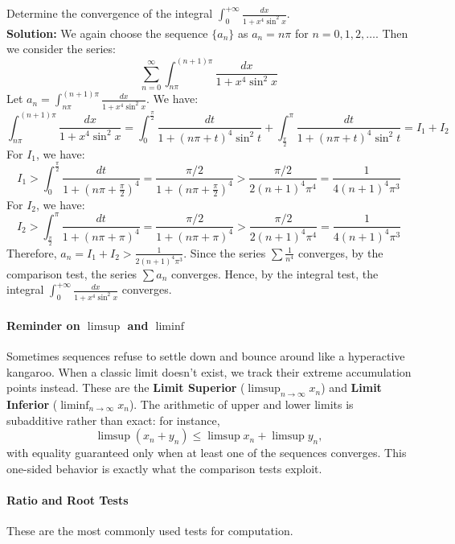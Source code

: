 \begin{example}
    Determine the convergence of the integral $\int_{0}^{+\infty} \frac{dx}{1 + x^4 \sin^2 x}$. \\
    \textbf{Solution:} We again choose the sequence $\{a_n\}$ as $a_n = n\pi$ for $n = 0, 1, 2, \ldots$. Then we consider the series:
    \[\sum_{n=0}^{\infty} \int_{n\pi}^{(n+1)\pi} \frac{dx}{1 + x^4 \sin^2 x}\]
    Let $a_n = \int_{n\pi}^{(n+1)\pi} \frac{dx}{1 + x^4 \sin^2 x}$. We have:
    \[
    \int_{n\pi}^{(n+1)\pi} \frac{dx}{1 + x^4 \sin^2 x}
    = \int_{0}^{\frac{\pi}{2}} \frac{dt}{1 + (n\pi + t)^4 \sin^2 t} + \int_{\frac{\pi}{2}}^{\pi} \frac{dt}{1 + (n\pi + t)^4 \sin^2 t} = I_1 + I_2
    \]
    For $I_1$, we have:
    \[I_1 > \int_{0}^{\frac{\pi}{2}} \frac{dt}{1 + (n\pi + \frac{\pi}{2})^4} = \frac{\pi/2}{1 + (n\pi + \frac{\pi}{2})^4} > \frac{\pi/2}{2(n+1)^4 \pi^4} = \frac{1}{4(n+1)^4 \pi^3}\]
    For $I_2$, we have:
    \[I_2 > \int_{\frac{\pi}{2}}^{\pi} \frac{dt}{1 + (n\pi + \pi)^4} = \frac{\pi/2}{1 + (n\pi + \pi)^4} > \frac{\pi/2}{2(n+1)^4 \pi^4} = \frac{1}{4(n+1)^4 \pi^3}\]
    Therefore, $a_n = I_1 + I_2 > \frac{1}{2(n+1)^4 \pi^3}$. Since the series $\sum \frac{1}{n^4}$ converges, by the comparison test, the series $\sum a_n$ converges. Hence, by the integral test, the integral $\int_{0}^{+\infty} \frac{dx}{1 + x^4 \sin^2 x}$ converges.
\end{example}

\paragraph{Reminder on $\limsup$ and $\liminf$}
Sometimes sequences refuse to settle down and bounce around like a hyperactive kangaroo. When a classic limit doesn't exist, we track their extreme accumulation points instead. These are the \textbf{Limit Superior} ($\limsup_{n \to \infty} x_n$) and \textbf{Limit Inferior} ($\liminf_{n \to \infty} x_n$). 
The arithmetic of upper and lower limits is subadditive rather than exact: for instance,
\[
    \limsup (x_n + y_n) \le \limsup x_n + \limsup y_n,
\]
with equality guaranteed only when at least one of the sequences converges. This one-sided behavior is exactly what the comparison tests exploit.

\paragraph{Ratio and Root Tests}
These are the most commonly used tests for computation.

